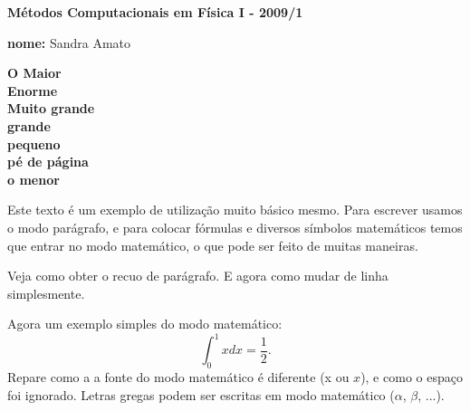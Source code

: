 \documentclass{article}
\begin{document}
%
\begin{flushleft}
{\bf Métodos Computacionais em Física I - 2009/1}\\
\end{flushleft}
\begin{flushright}
{\bf nome:} Sandra Amato\\
\end{flushright}
\begin{center}
\Huge{\bf O Maior}\\
\huge{\bf Enorme}\\
\Large{\bf Muito grande}\\
\large{\bf grande}\\
\small{\bf pequeno}\\
\footnotesize{\bf pé de página}\\ 
\scriptsize{\bf o menor}
\end{center}
Este texto é um exemplo de utilização muito básico mesmo. Para escrever
 u\-sa\-mos %
o modo parágrafo, e para colocar fórmulas e diversos símbolos 
 matemáticos temos que entrar no modo matemático, o que pode
ser 
feito de muitas maneiras.

Veja como obter o recuo de parágrafo. E agora como mudar de linha\\ simplesmente.

Agora um exemplo simples do modo matemático:
$$ \int_0^1x dx=\frac{1}{2}. $$
Repare como a a fonte do modo matemático é diferente (x ou $x$), e como 
o espaço foi ignorado. Letras gregas podem ser escritas em modo matemático ($\alpha$, $\beta$, ...).
\end{document}
